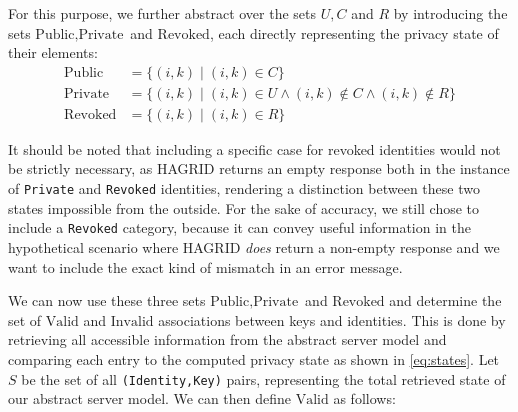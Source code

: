 For this purpose, we further abstract over the sets \(U,C\) and \(R\) by introducing the sets \(\text{Public},\text{Private}\) and \(\text{Revoked}\),
each directly representing the privacy state of their elements: 
\begin{align}
    \text{Public}  &= \bigl \{ (i,k) \; \big|\; (i,k) \in C\bigr\}  \nonumber \\
    \text{Private} &= \bigl \{ (i,k) \; \big|\; (i,k) \in U \wedge (i,k) \notin C \wedge (i,k) \notin R\bigr\}  \\
    \text{Revoked} &= \bigl \{ (i,k) \; \big|\; (i,k) \in R\bigr\} \nonumber
\end{align}

It should be noted that including a specific case for revoked identities would not be strictly necessary, as HAGRID returns an empty response both in the instance of \texttt{Private} and \texttt{Revoked} identities, rendering a distinction between these two states impossible from the outside. For the sake of accuracy, we still chose to include a \texttt{Revoked} category, because it can convey useful information in the hypothetical scenario where HAGRID \emph{does} return a non-empty response and we want to include the exact kind of mismatch in an error message.

We can now use these three sets \(\text{Public},\text{Private}\) and \(\text{Revoked}\) and determine the set of \(\text{Valid}\) and \(\text{Invalid}\) associations between keys and identities. This is done by retrieving all accessible information from the abstract server model and comparing each entry to the computed privacy state as shown in \ref{eq:states}. Let \(S\) be the set of all \texttt{(Identity,Key)} pairs, representing the total retrieved state of our abstract server model. We can then define \(\text{Valid}\) as follows:  

